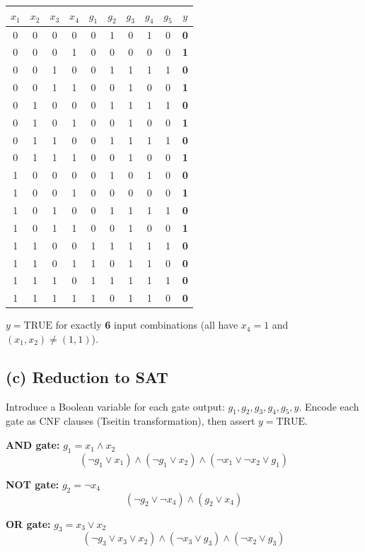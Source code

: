 \documentclass[12pt]{article}
\begin{document}
\medskip
\begin{center}
\begin{tabular}{|c|c|c|c|c|c|c|c|c|c|}
\hline
$x_1$ & $x_2$ & $x_3$ & $x_4$ & $g_1$ & $g_2$ & $g_3$ & $g_4$ & $g_5$ & $y$ \\
\hline
0&0&0&0& 0&1&0&1&0&\textbf{0}\\
0&0&0&1& 0&0&0&0&0&\textbf{1}\\
0&0&1&0& 0&1&1&1&1&\textbf{0}\\
0&0&1&1& 0&0&1&0&0&\textbf{1}\\
0&1&0&0& 0&1&1&1&1&\textbf{0}\\
0&1&0&1& 0&0&1&0&0&\textbf{1}\\
0&1&1&0& 0&1&1&1&1&\textbf{0}\\
0&1&1&1& 0&0&1&0&0&\textbf{1}\\
1&0&0&0& 0&1&0&1&0&\textbf{0}\\
1&0&0&1& 0&0&0&0&0&\textbf{1}\\
1&0&1&0& 0&1&1&1&1&\textbf{0}\\
1&0&1&1& 0&0&1&0&0&\textbf{1}\\
1&1&0&0& 1&1&1&1&1&\textbf{0}\\
1&1&0&1& 1&0&1&1&0&\textbf{0}\\
1&1&1&0& 1&1&1&1&1&\textbf{0}\\
1&1&1&1& 1&0&1&1&0&\textbf{0}\\
\hline
\end{tabular}
\end{center}

$y = \mathrm{TRUE}$ for exactly \textbf{6} input combinations (all have $x_4=1$
and $(x_1,x_2)\neq(1,1)$).

\subsection*{(c) Reduction to SAT}

Introduce a Boolean variable for each gate output: $g_1,g_2,g_3,g_4,g_5,y$.
Encode each gate as CNF clauses (Tseitin transformation), then assert
$y = \mathrm{TRUE}$.

\medskip
\noindent\textbf{AND gate:} $g_1 = x_1 \land x_2$
\[(\lnot g_1\lor x_1)\land(\lnot g_1\lor x_2)\land(\lnot x_1\lor\lnot x_2\lor g_1)\]

\noindent\textbf{NOT gate:} $g_2 = \lnot x_4$
\[(\lnot g_2\lor\lnot x_4)\land(g_2\lor x_4)\]

\noindent\textbf{OR gate:} $g_3 = x_3\lor x_2$
\[(\lnot g_3\lor x_3\lor x_2)\land(\lnot x_3\lor g_3)\land(\lnot x_2\lor g_3)\]
\end{document}
